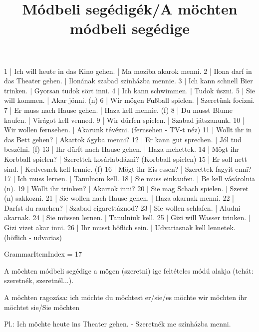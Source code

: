 \begin{exmp}
1 | Ich will heute in das Kino gehen. | Ma moziba akarok menni.
2 | Ilona darf in das Theater gehen. | Ilonának szabad színházba mennie.
3 | Ich kann schnell Bier trinken. | Gyorsan tudok sört inni.
4 | Ich kann schwimmen. | Tudok úszni.
5 | Sie will kommen. | Akar jönni. (n)
6 | Wir mögen Fußball spielen. | Szeretünk focizni.
7 | Er muss nach Hause gehen. | Haza kell mennie. (f)
8 | Du musst Blume kaufen. | Virágot kell venned.
9 | Wir dürfen spielen. | Szabad játszanunk.
10 | Wir wollen fernsehen. | Akarunk tévézni. (fernsehen - TV-t néz)
11 | Wollt ihr in das Bett gehen? | Akartok ágyba menni?
12 | Er kann gut sprechen. | Jól tud beszélni. (f)
13 | Ihr dürft nach Hause gehen. | Haza mehettek.
14 | Mögt ihr Korbball spielen? | Szerettek kosárlabdázni? (Korbball spielen)
15 | Er soll nett sind. | Kedvesnek kell lennie. (f)
16 | Mögt ihr Eis essen? | Szerettek fagyit enni?
17 | Ich muss lernen. | Tanulnom kell.
18 | Sie muss einkaufen. | Be kell vásárolnia (n).
19 | Wollt ihr trinken? | Akartok inni?
20 | Sie mag Schach spielen. | Szeret (n) sakkozni.
21 | Sie wollen nach Hause gehen. | Haza akarnak menni.
22 | Darfst du rauchen? | Szabad cigarettáznod?
23 | Sie wollen schlafen. | Aludni akarnak.
24 | Sie müssen lernen. | Tanulniuk kell.
25 | Gizi will Wasser trinken. | Gizi vizet akar inni.
26 | Ihr musst höflich sein. | Udvariasnak kell lennetek. (höflich - udvarias)
\end{exmp}

\title{Módbeli segédigék/A möchten módbeli segédige}

GrammarItemIndex = 17

\begin{desc}
A möchten módbeli segédige a mögen (szeretni) ige feltételes módú alakja (tehát: szeretnék, szeretnél...).

A möchten ragozása:
ich möchte
du möchtest
er/sie/es möchte
wir möchten
ihr möchtet
sie/Sie möchten

Pl.: Ich möchte heute ins Theater gehen. - Szeretnék me színházba menni.
\end{desc}

